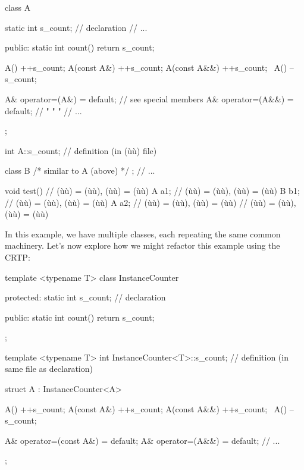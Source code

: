\begin{emcppslisting}
class A
{
    static int s_count;  // declaration
    // ...

public:
    static int count() { return s_count; }

    A()          { ++s_count; }
    A(const A&)  { ++s_count; }
    A(const A&&) { ++s_count; }
    ~A()         { --s_count; }

    A& operator=(A&)  = default;  // see special members
    A& operator=(A&&) = default;  //  "     "       "
    // ...
};

int A::s_count;  // definition (in (ù{}ù) file)

class B { /* similar to A (above) */ };
// ...

void test()
{          // (ù{}ù) = (ù{}ù), (ù{}ù) = (ù{}ù)
    A a1;  // (ù{}ù) = (ù{}ù), (ù{}ù) = (ù{}ù)
    B b1;  // (ù{}ù) = (ù{}ù), (ù{}ù) = (ù{}ù)
    A a2;  // (ù{}ù) = (ù{}ù), (ù{}ù) = (ù{}ù)
}          // (ù{}ù) = (ù{}ù), (ù{}ù) = (ù{}ù)
\end{emcppslisting}
    
\noindent In this example, we have multiple classes, each repeating the same
common machinery. Let's now explore how we might refactor this example
using the CRTP:

\begin{emcppslisting}[emcppsbatch=e4]
template <typename T>
class InstanceCounter
{
protected:
    static int s_count;  // declaration

public:
    static int count() { return s_count; }
};

template <typename T>
int InstanceCounter<T>::s_count;  // definition (in same file as declaration)

struct A : InstanceCounter<A>
{
    A()          { ++s_count; }
    A(const A&)  { ++s_count; }
    A(const A&&) { ++s_count; }
    ~A()         { --s_count; }

    A& operator=(const A&)  = default;
    A& operator=(A&&)       = default;
    // ...
};
\end{emcppslisting}
    
